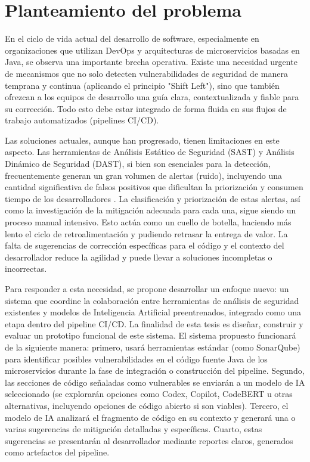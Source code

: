 \section{Planteamiento del problema}\label{sec:planteamiento_problema}
En el ciclo de vida actual del desarrollo de software, especialmente en organizaciones que utilizan DevOps y arquitecturas de microservicios basadas en Java, se observa una importante brecha operativa. Existe una necesidad urgente de mecanismos que no solo detecten vulnerabilidades de seguridad de manera temprana y continua (aplicando el principio "Shift Left"), sino que también ofrezcan a los equipos de desarrollo una guía clara, contextualizada y fiable para su corrección. Todo esto debe estar integrado de forma fluida en sus flujos de trabajo automatizados (pipelines CI/CD).

Las soluciones actuales, aunque han progresado, tienen limitaciones en este aspecto. Las herramientas de Análisis Estático de Seguridad (SAST) y Análisis Dinámico de Seguridad (DAST), si bien son esenciales para la detección, frecuentemente generan un gran volumen de alertas (ruido), incluyendo una cantidad significativa de falsos positivos que dificultan la priorización y consumen tiempo de los desarrolladores \cite{11}. La clasificación y priorización de estas alertas, así como la investigación de la mitigación adecuada para cada una, sigue siendo un proceso manual intensivo. Esto actúa como un cuello de botella, haciendo más lento el ciclo de retroalimentación y pudiendo retrasar la entrega de valor. La falta de sugerencias de corrección específicas para el código y el contexto del desarrollador reduce la agilidad y puede llevar a soluciones incompletas o incorrectas.

Para responder a esta necesidad, se propone desarrollar un enfoque nuevo: un sistema que coordine la colaboración entre herramientas de análisis de seguridad existentes y modelos de Inteligencia Artificial preentrenados, integrado como una etapa dentro del pipeline CI/CD. La finalidad de esta tesis es diseñar, construir y evaluar un prototipo funcional de este sistema. El sistema propuesto funcionará de la siguiente manera: primero, usará herramientas estándar (como SonarQube) para identificar posibles vulnerabilidades en el código fuente Java de los microservicios durante la fase de integración o construcción del pipeline. Segundo, las secciones de código señaladas como vulnerables se enviarán a un modelo de IA seleccionado (se explorarán opciones como Codex, Copilot, CodeBERT u otras alternativas, incluyendo opciones de código abierto si son viables). Tercero, el modelo de IA analizará el fragmento de código en su contexto y generará una o varias sugerencias de mitigación detalladas y específicas. Cuarto, estas sugerencias se presentarán al desarrollador mediante reportes claros, generados como artefactos del pipeline.

